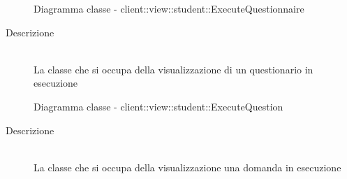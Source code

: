 \vspace{0.5cm}
\hypertarget{client::view::student::ExecuteQuestionnaire}{}
\begin{figure}[H]
	\centering
	\caption{Diagramma classe - client::view::student::ExecuteQuestionnaire}
\end{figure}\begin{description}
\item[Descrizione] \hfill \\
La classe che si occupa della visualizzazione di un questionario in esecuzione
\end{description}

\vspace{0.5cm}
\hypertarget{client::view::student::ExecuteQuestion}{}
\begin{figure}[H]
	\centering
	\caption{Diagramma classe - client::view::student::ExecuteQuestion}
\end{figure}\begin{description}
\item[Descrizione] \hfill \\
La classe che si occupa della visualizzazione una domanda in esecuzione
\end{description}

\vspace{0.5cm}
